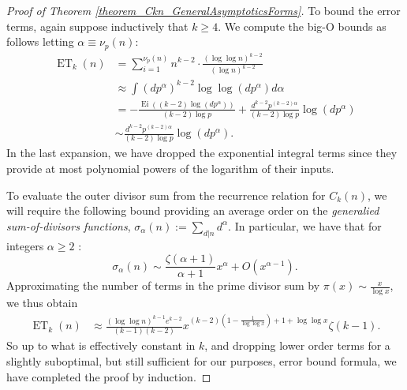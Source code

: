 \documentclass[11pt,reqno,a4letter]{article}
\numberwithin{figure}{section}
\numberwithin{table}{section}
\theoremstyle{plain}
\numberwithin{theorem}{section}
\theoremstyle{definition}
\begin{document}
\begin{proof}[Proof of Theorem \ref{theorem_Ckn_GeneralAsymptoticsForms}]
To bound the error terms, again suppose inductively that $k \geq 4$. We compute the 
big-O bounds as follows letting $\alpha \equiv \nu_p(n)$: 
\begin{align*} 
\operatorname{ET}_k(n) & = 
     \sum_{i=1}^{\nu_p(n)} n^{k-2} \cdot \frac{(\log\log n)^{k-2}}{(\log n)^{k-2}} \\ 
     & \approx 
     \int (dp^{\alpha})^{k-2} \log\log(dp^{\alpha}) d\alpha \\ 
     & = -\frac{\operatorname{Ei}((k-2) \log(dp^{\alpha}))}{(k-2) \log p} + 
     \frac{d^{k-2} p^{(k-2)\alpha}}{(k-2) \log p} \log(dp^{\alpha}) \\ 
     & \sim \frac{d^{k-2} p^{(k-2)\alpha}}{(k-2) \log p} \log(dp^{\alpha}). 
\end{align*} 
In the last expansion, we have dropped the exponential integral terms since they provide at most 
polynomial powers of the logarithm of their inputs. 

To evaluate the outer divisor sum from the recurrence relation for $C_k(n)$, we will require the 
following bound providing an average order on the \emph{generalied sum-of-divisors functions}, 
$\sigma_{\alpha}(n) := \sum_{d|n} d^{\alpha}$. In particular, we have that for integers $\alpha \geq 2$ 
\cite[\S 27.11]{NISTHB}: 
\[
\sigma_{\alpha}(n) \sim \frac{\zeta(\alpha+1)}{\alpha+1} x^{\alpha} + O(x^{\alpha-1}). 
\]
Approximating the number of terms in the prime divisor sum by $\pi(x) \sim \frac{x}{\log x}$, 
we thus obtain 
\begin{align*} 
\operatorname{ET}_k(n) & \approx \frac{(\log\log n)^{k-1} e^{k-2}}{(k-1)(k-2)} 
     x^{(k-2)\left(1-\frac{1}{\log\log x}\right)+1+\log\log x} \zeta(k-1). 
\end{align*} 
So up to what is effectively constant in $k$, and dropping lower order terms for a slightly 
suboptimal, but still sufficient for our purposes, error bound formula, 
we have completed the proof by induction. 
\end{proof} 
\end{document}
